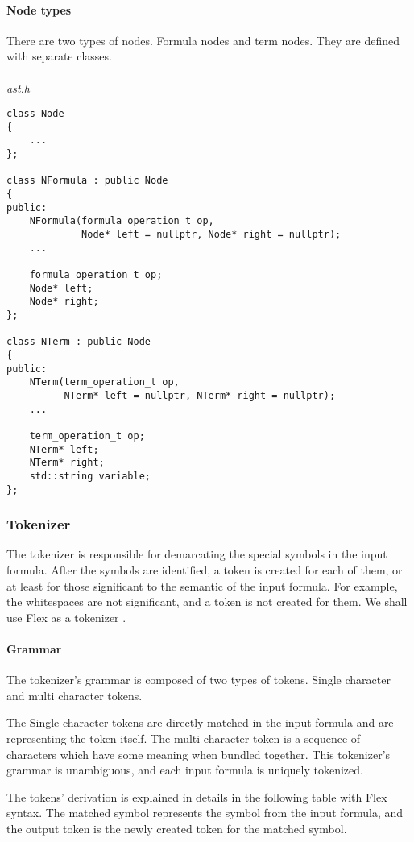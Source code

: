 \documentclass{article}
\begin{document}
	\newpage
	\paragraph{Node types} There are two types of nodes. Formula nodes and term nodes. They are defined with separate classes.
	\\
	\\
\noindent
\textit{ast.h}
	\begin{lstlisting}
class Node
{
    ...
};

class NFormula : public Node
{
public:
    NFormula(formula_operation_t op,
             Node* left = nullptr, Node* right = nullptr);
    ...

    formula_operation_t op;
    Node* left;
    Node* right;
};

class NTerm : public Node
{
public:
    NTerm(term_operation_t op,
          NTerm* left = nullptr, NTerm* right = nullptr);
    ...

    term_operation_t op;
    NTerm* left;
    NTerm* right;
    std::string variable;
};
	\end{lstlisting}

	\subsubsection{Tokenizer}
	The tokenizer is responsible for demarcating the special symbols in the input formula.
	After the symbols are identified, a token is created for each of them, or at least for those significant to the semantic of the input formula.
	For example, the whitespaces are not significant, and a token is not created for them.
	We shall use Flex as a tokenizer \cite{flex-tokenizer}.

	\paragraph{Grammar} The tokenizer's grammar is composed of two types of tokens. Single character and multi character tokens.

	The Single character tokens are directly matched in the input formula and are representing the token itself.
	The multi character token is a sequence of characters which have some meaning when bundled together.
	This tokenizer's grammar is unambiguous, and each input formula is uniquely tokenized.

	The tokens' derivation is explained in details in the following table with Flex syntax. The matched symbol represents the symbol from the input formula, and the output token is the newly created token for the matched symbol.
\end{document}
